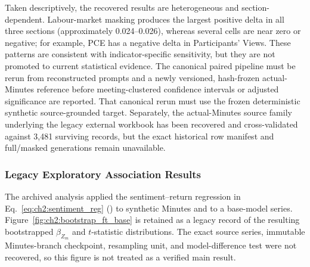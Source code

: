 Taken descriptively, the recovered results are heterogeneous and
section-dependent. Labour-market masking produces the largest positive delta
in all three sections (approximately 0.024--0.026), whereas several cells are
near zero or negative; for example, PCE has a negative delta in Participants'
Views. These patterns are consistent with indicator-specific sensitivity, but
they are not promoted to current statistical evidence. The canonical paired
pipeline must be rerun from reconstructed prompts and a newly versioned,
hash-frozen actual-Minutes reference before meeting-clustered confidence
intervals or adjusted significance are reported. That canonical rerun must use
the frozen deterministic synthetic source-grounded target. Separately, the
actual-Minutes source family underlying the legacy external workbook has been
recovered and cross-validated against 3,481 surviving records, but the exact
historical row manifest and full/masked generations remain unavailable.








\subsubsection*{Legacy Exploratory Association Results}

The archived analysis applied the sentiment--return regression in Eq.~\ref{eq:ch2:sentiment_reg} (\citet{tadle2022fomc}) to synthetic Minutes and to a base-model series. Figure~\ref{fig:ch2:bootstrap_ft_base} is retained as a legacy record of the resulting bootstrapped $\beta_{Z_m}$ and $t$-statistic distributions. The exact source series, immutable Minutes-branch checkpoint, resampling unit, and model-difference test were not recovered, so this figure is not treated as a verified main result.


